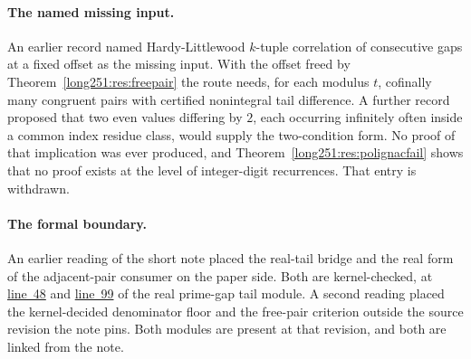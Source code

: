 \paragraph{The named missing input.}  An earlier record named
Hardy-Littlewood $k$-tuple correlation of consecutive gaps at a fixed offset as
the missing input.  With the offset freed by Theorem~\ref{long251:res:freepair} the
route needs, for each modulus $t$, cofinally many congruent pairs with
certified nonintegral tail difference.  A further record proposed that two even
values differing by $2$, each occurring infinitely often inside a common index
residue class, would supply the two-condition form.  No proof of that
implication was ever produced, and Theorem~\ref{long251:res:polignacfail} shows that no
proof exists at the level of integer-digit recurrences.  That entry is
withdrawn.

\paragraph{The formal boundary.}  An earlier reading of the short note placed
the real-tail bridge and the real form of the adjacent-pair consumer on the
paper side.  Both are kernel-checked, at
\href{https://github.com/wcook04/plectis-erdos/blob/3d6d938d696fed0fb71dd55115a18a73738ff223/lean/ErdosProblems/Erdos251/RealPrimeGapTail.lean\#L48}{line~48}
and
\href{https://github.com/wcook04/plectis-erdos/blob/3d6d938d696fed0fb71dd55115a18a73738ff223/lean/ErdosProblems/Erdos251/RealPrimeGapTail.lean\#L99}{line~99}
of the real prime-gap tail module.  A second reading placed the kernel-decided
denominator floor and the free-pair criterion outside the source revision the
note pins.  Both modules are present at that revision, and both are linked from
the note.
